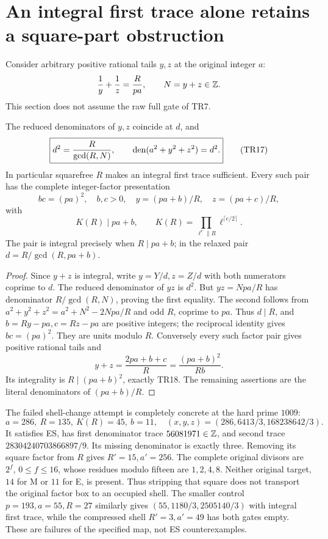 \section{An integral first trace alone retains a square-part obstruction}
Consider arbitrary positive rational tails $y,z$ at the original integer $a$:
\[
 \frac1y+\frac1z=\frac R{pa},\qquad N=y+z\in\mathbb Z.
\]
This section does not assume the raw full gate of TR7.

\begin{theorem}\label{thm:tail}
The reduced denominators of $y,z$ coincide at $d$, and
\[
 \boxed{d^2=\frac R{\gcd(R,N)},\qquad
 \operatorname{den}(a^2+y^2+z^2)=d^2.}                                \tag{TR17}
\]
In particular squarefree $R$ makes an integral first trace sufficient.
Every such pair has the complete integer-factor presentation
\[
 b c=(pa)^2,\quad b,c>0,\quad
 y=(pa+b)/R,\quad z=(pa+c)/R,
\]
with
\[
 \boxed{K(R)\mid pa+b,\qquad
 K(R)=\prod_{\ell^e\parallel R}\ell^{\lceil e/2\rceil}.} \tag{TR18}
\]
The pair is integral precisely when $R\mid pa+b$; in the relaxed pair
$d=R/\gcd(R,pa+b)$.
\end{theorem}
\begin{proof}
Since $y+z$ is integral, write $y=Y/d,z=Z/d$ with both numerators coprime to $d$.
The reduced denominator of $yz$ is $d^2$. But $yz=Npa/R$ has denominator
$R/\gcd(R,N)$, proving the first equality. The second follows from
$a^2+y^2+z^2=a^2+N^2-2Npa/R$ and odd $R$, coprime to $pa$.
Thus $d\mid R$, and $b=Ry-pa,c=Rz-pa$ are positive integers; the reciprocal
identity gives $bc=(pa)^2$. They are units modulo $R$. Conversely every such
factor pair gives positive rational tails and
\[
 y+z=\frac{2pa+b+c}{R}=\frac{(pa+b)^2}{Rb}.
\]
Its integrality is $R\mid(pa+b)^2$, exactly TR18. The remaining assertions
are the literal denominators of $(pa+b)/R$.
\end{proof}

The failed shell-change attempt is completely concrete at the hard prime $1009$:
\[
 \boxed{a=286,\ R=135,\ K(R)=45,\ b=11,\quad
 (x,y,z)=(286,6413/3,168238642/3).}                      \tag{TR19}
\]
It satisfies ES, has first denominator trace $56081971\in\mathbb Z$, and second trace
$28304240703866897/9$. Its missing denominator is exactly three. Removing its
square factor from $R$ gives $R'=15,a'=256$. The complete original divisors are
$2^f$, $0\le f\le16$, whose residues modulo fifteen are $1,2,4,8$.
Neither original target, $14$ for M or $11$ for E, is present. Thus stripping
that square does not transport the original factor box to an occupied shell.
The smaller control $p=193,a=55,R=27$ similarly gives
$(55,1180/3,2505140/3)$ with integral first trace, while the compressed shell
$R'=3,a'=49$ has both gates empty. These are failures of the specified map,
not ES counterexamples.

